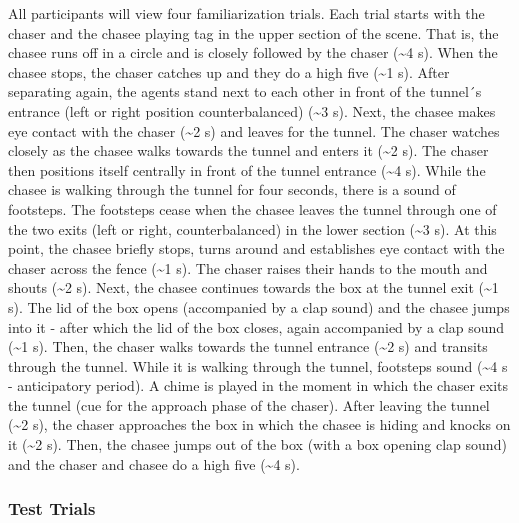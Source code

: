\documentclass[
  english,
  man, donotrepeattitle,floatsintext]{apa6}
\begin{document}
All participants will view four familiarization trials. Each trial starts with the chaser and the chasee playing tag in the upper section of the scene. That is, the chasee runs off in a circle and is closely followed by the chaser (\textasciitilde4 s). When the chasee stops, the chaser catches up and they do a high five (\textasciitilde1 s). After separating again, the agents stand next to each other in front of the tunnel´s entrance (left or right position counterbalanced) (\textasciitilde3 s). Next, the chasee makes eye contact with the chaser (\textasciitilde2 s) and leaves for the tunnel. The chaser watches closely as the chasee walks towards the tunnel and enters it (\textasciitilde2 s). The chaser then positions itself centrally in front of the tunnel entrance (\textasciitilde4 s). While the chasee is walking through the tunnel for four seconds, there is a sound of footsteps. The footsteps cease when the chasee leaves the tunnel through one of the two exits (left or right, counterbalanced) in the lower section (\textasciitilde3 s). At this point, the chasee briefly stops, turns around and establishes eye contact with the chaser across the fence (\textasciitilde1 s). The chaser raises their hands to the mouth and shouts (\textasciitilde2 s). Next, the chasee continues towards the box at the tunnel exit (\textasciitilde1 s). The lid of the box opens (accompanied by a clap sound) and the chasee jumps into it - after which the lid of the box closes, again accompanied by a clap sound (\textasciitilde1 s). Then, the chaser walks towards the tunnel entrance (\textasciitilde2 s) and transits through the tunnel. While it is walking through the tunnel, footsteps sound (\textasciitilde4 s - anticipatory period). A chime is played in the moment in which the chaser exits the tunnel (cue for the approach phase of the chaser). After leaving the tunnel (\textasciitilde2 s), the chaser approaches the box in which the chasee is hiding and knocks on it (\textasciitilde2 s). Then, the chasee jumps out of the box (with a box opening clap sound) and the chaser and chasee do a high five (\textasciitilde4 s).

\hypertarget{test-trials}{%
\subsubsection{Test Trials}\label{test-trials}}
\end{document}
